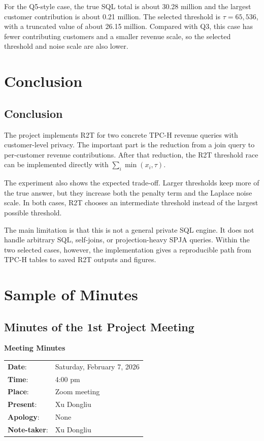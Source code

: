 \documentclass[12pt,a4paper]{report}
\begin{document}
For the Q5-style case, the true SQL total is about 30.28 million and the
largest customer contribution is about 0.21 million.  The selected
threshold is $\tau=65{,}536$, with a truncated value of about 26.15
million.  Compared with Q3, this case has fewer contributing customers
and a smaller revenue scale, so the selected threshold and noise scale
are also lower.

\chapter{Conclusion}

\section{Conclusion}

The project implements R2T for two concrete TPC-H revenue queries with
customer-level privacy.  The important part is the reduction from a join
query to per-customer revenue contributions.  After that reduction, the
R2T threshold race can be implemented directly with
$\sum_i \min(x_i,\tau)$.

The experiment also shows the expected trade-off.  Larger thresholds keep
more of the true answer, but they increase both the penalty term and the
Laplace noise scale.  In both cases, R2T chooses an intermediate
threshold instead of the largest possible threshold.

The main limitation is that this is not a general private SQL engine.  It
does not handle arbitrary SQL, self-joins, or projection-heavy SPJA
queries.  Within the two selected cases, however, the implementation gives
a reproducible path from TPC-H tables to saved R2T outputs and figures.

\appendix
\chapter{Sample of Minutes}

\section{Minutes of the 1st Project Meeting}
\begin{center}
\textbf{Meeting Minutes}
\end{center}

\begin{tabular}{ll}
\textbf{Date}: & Saturday, February 7, 2026 \\
\textbf{Time}: & 4:00 pm \\
\textbf{Place}: & Zoom meeting \\
\textbf{Present}: & Xu Dongliu \\
\textbf{Apology}: & None \\
\textbf{Note-taker}: & Xu Dongliu \\
\end{tabular}
\end{document}
